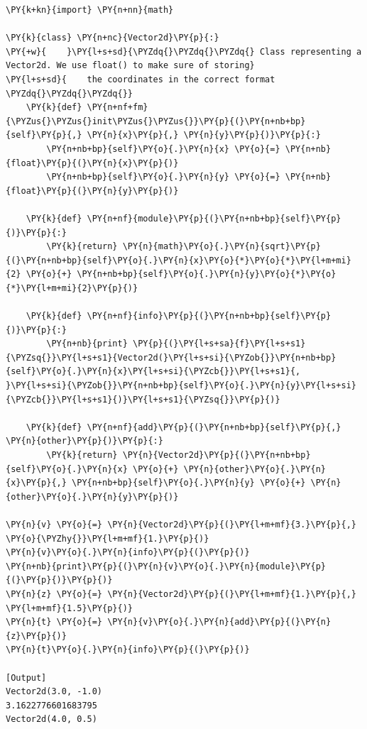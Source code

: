 \begin{Verbatim}[label=\makebox{\url{https://github.com/lucabaldini/cmepda/tree/master/slides/latex/snippets/vector2d\_naive.py}},commandchars=\\\{\}]
\PY{k+kn}{import} \PY{n+nn}{math}

\PY{k}{class} \PY{n+nc}{Vector2d}\PY{p}{:}
\PY{+w}{    }\PY{l+s+sd}{\PYZdq{}\PYZdq{}\PYZdq{} Class representing a Vector2d. We use float() to make sure of storing}
\PY{l+s+sd}{    the coordinates in the correct format \PYZdq{}\PYZdq{}\PYZdq{}}
    \PY{k}{def} \PY{n+nf+fm}{\PYZus{}\PYZus{}init\PYZus{}\PYZus{}}\PY{p}{(}\PY{n+nb+bp}{self}\PY{p}{,} \PY{n}{x}\PY{p}{,} \PY{n}{y}\PY{p}{)}\PY{p}{:}
        \PY{n+nb+bp}{self}\PY{o}{.}\PY{n}{x} \PY{o}{=} \PY{n+nb}{float}\PY{p}{(}\PY{n}{x}\PY{p}{)}
        \PY{n+nb+bp}{self}\PY{o}{.}\PY{n}{y} \PY{o}{=} \PY{n+nb}{float}\PY{p}{(}\PY{n}{y}\PY{p}{)}

    \PY{k}{def} \PY{n+nf}{module}\PY{p}{(}\PY{n+nb+bp}{self}\PY{p}{)}\PY{p}{:}
        \PY{k}{return} \PY{n}{math}\PY{o}{.}\PY{n}{sqrt}\PY{p}{(}\PY{n+nb+bp}{self}\PY{o}{.}\PY{n}{x}\PY{o}{*}\PY{o}{*}\PY{l+m+mi}{2} \PY{o}{+} \PY{n+nb+bp}{self}\PY{o}{.}\PY{n}{y}\PY{o}{*}\PY{o}{*}\PY{l+m+mi}{2}\PY{p}{)}

    \PY{k}{def} \PY{n+nf}{info}\PY{p}{(}\PY{n+nb+bp}{self}\PY{p}{)}\PY{p}{:}
        \PY{n+nb}{print} \PY{p}{(}\PY{l+s+sa}{f}\PY{l+s+s1}{\PYZsq{}}\PY{l+s+s1}{Vector2d(}\PY{l+s+si}{\PYZob{}}\PY{n+nb+bp}{self}\PY{o}{.}\PY{n}{x}\PY{l+s+si}{\PYZcb{}}\PY{l+s+s1}{, }\PY{l+s+si}{\PYZob{}}\PY{n+nb+bp}{self}\PY{o}{.}\PY{n}{y}\PY{l+s+si}{\PYZcb{}}\PY{l+s+s1}{)}\PY{l+s+s1}{\PYZsq{}}\PY{p}{)}

    \PY{k}{def} \PY{n+nf}{add}\PY{p}{(}\PY{n+nb+bp}{self}\PY{p}{,} \PY{n}{other}\PY{p}{)}\PY{p}{:}
        \PY{k}{return} \PY{n}{Vector2d}\PY{p}{(}\PY{n+nb+bp}{self}\PY{o}{.}\PY{n}{x} \PY{o}{+} \PY{n}{other}\PY{o}{.}\PY{n}{x}\PY{p}{,} \PY{n+nb+bp}{self}\PY{o}{.}\PY{n}{y} \PY{o}{+} \PY{n}{other}\PY{o}{.}\PY{n}{y}\PY{p}{)}

\PY{n}{v} \PY{o}{=} \PY{n}{Vector2d}\PY{p}{(}\PY{l+m+mf}{3.}\PY{p}{,} \PY{o}{\PYZhy{}}\PY{l+m+mf}{1.}\PY{p}{)}
\PY{n}{v}\PY{o}{.}\PY{n}{info}\PY{p}{(}\PY{p}{)}
\PY{n+nb}{print}\PY{p}{(}\PY{n}{v}\PY{o}{.}\PY{n}{module}\PY{p}{(}\PY{p}{)}\PY{p}{)}
\PY{n}{z} \PY{o}{=} \PY{n}{Vector2d}\PY{p}{(}\PY{l+m+mf}{1.}\PY{p}{,} \PY{l+m+mf}{1.5}\PY{p}{)}
\PY{n}{t} \PY{o}{=} \PY{n}{v}\PY{o}{.}\PY{n}{add}\PY{p}{(}\PY{n}{z}\PY{p}{)}
\PY{n}{t}\PY{o}{.}\PY{n}{info}\PY{p}{(}\PY{p}{)}

[Output]
Vector2d(3.0, -1.0)
3.1622776601683795
Vector2d(4.0, 0.5)
\end{Verbatim}
